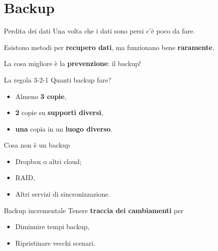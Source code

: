 
\section{Backup}

\begin{myframe}{Perdita dei dati}
  Una volta che i dati sono persi c'è poco da fare.

  Esistono metodi per \textbf{recupero dati}, ma funzionano bene \textbf{raramente}.

  La cosa migliore è la \textbf{prevenzione}: il backup!
\end{myframe}

\begin{myframe}{La regola 3-2-1}
  Quanti backup fare?
  \pause
  \begin{itemize}[<+->]
    \item Almeno \textbf{3 copie},
    \item \textbf{2} copie su \textbf{supporti diversi},
    \item \textbf{una} copia in un \textbf{luogo diverso}.
  \end{itemize}

  \medskip
\end{myframe}

\begin{myframe}{Cosa non è un backup}
  \begin{itemize}[<+->]
    \item Dropbox o altri cloud;
    \item RAID,
    \item Altri servizi di sincronizzazione.
  \end{itemize}
  \medskip
\end{myframe}

\begin{myframe}{Backup incrementale}
  Tenere \textbf{traccia dei cambiamenti} per
  \begin{itemize}
    \item Diminuire tempi backup,
    \item Ripristinare vecchi scenari.
  \end{itemize}
\end{myframe}

